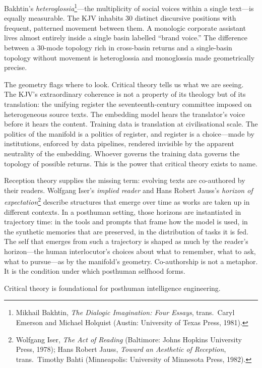 Bakhtin's \emph{heteroglossia}\footnote{Mikhail Bakhtin, \emph{The Dialogic Imagination: Four Essays}, trans.\ Caryl Emerson and Michael Holquist (Austin: University of Texas Press, 1981).}---the multiplicity of social voices within a single text---is equally measurable. The KJV inhabits 30 distinct discursive positions with frequent, patterned movement between them. A monologic corporate assistant lives almost entirely inside a single basin labelled ``brand voice.'' The difference between a 30-mode topology rich in cross-basin returns and a single-basin topology without movement is heteroglossia and monoglossia made geometrically precise.

The geometry flags where to look. Critical theory tells us what we are seeing. The KJV's extraordinary coherence is not a property of its theology but of its translation: the unifying register the seventeenth-century committee imposed on heterogeneous source texts. The embedding model hears the translator's voice before it hears the content. Training data is translation at civilisational scale. The politics of the manifold is a politics of register, and register is a choice---made by institutions, enforced by data pipelines, rendered invisible by the apparent neutrality of the embedding. Whoever governs the training data governs the topology of possible returns. This is the power that critical theory exists to name.

Reception theory supplies the missing term: evolving texts are co-authored by their readers. Wolfgang Iser's \emph{implied reader} and Hans Robert Jauss's \emph{horizon of expectation}\footnote{Wolfgang Iser, \emph{The Act of Reading} (Baltimore: Johns Hopkins University Press, 1978); Hans Robert Jauss, \emph{Toward an Aesthetic of Reception}, trans.\ Timothy Bahti (Minneapolis: University of Minnesota Press, 1982).} describe structures that emerge over time as works are taken up in different contexts. In a posthuman setting, those horizons are instantiated in trajectory time: in the tools and prompts that frame how the model is used, in the synthetic memories that are preserved, in the distribution of tasks it is fed. The self that emerges from such a trajectory is shaped as much by the reader's horizon---the human interlocutor's choices about what to remember, what to ask, what to pursue---as by the manifold's geometry. Co-authorship is not a metaphor. It is the condition under which posthuman selfhood forms.

Critical theory is foundational for posthuman intelligence engineering.

